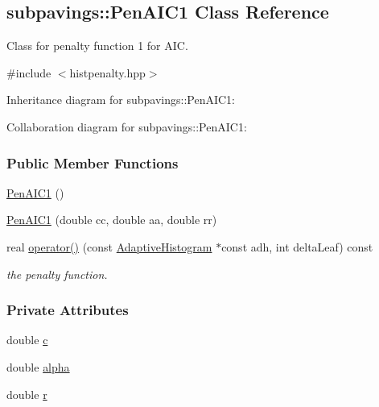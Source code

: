 \hypertarget{classsubpavings_1_1PenAIC1}{\subsection{subpavings\-:\-:\-Pen\-A\-I\-C1 \-Class \-Reference}
\label{classsubpavings_1_1PenAIC1}
}


\-Class for penalty function 1 for \-A\-I\-C.  




{\ttfamily \#include $<$histpenalty.\-hpp$>$}



\-Inheritance diagram for subpavings\-:\-:\-Pen\-A\-I\-C1\-:


\-Collaboration diagram for subpavings\-:\-:\-Pen\-A\-I\-C1\-:
\subsubsection*{\-Public \-Member \-Functions}
\begin{DoxyCompactItemize}
\item 
\hyperlink{classsubpavings_1_1PenAIC1_af50ef696466df5dd7d0a2af2969f5a34}{\-Pen\-A\-I\-C1} ()
\item 
\hyperlink{classsubpavings_1_1PenAIC1_a127629ff1787f6f756084fd95692dddc}{\-Pen\-A\-I\-C1} (double cc, double aa, double rr)
\item 
real \hyperlink{classsubpavings_1_1PenAIC1_a197da85b167c9086bfb90eeab0ec2375}{operator()} (const \hyperlink{classsubpavings_1_1AdaptiveHistogram}{\-Adaptive\-Histogram} $\ast$const adh, int delta\-Leaf) const 
\begin{DoxyCompactList}\small\item\em the penalty function. \end{DoxyCompactList}\end{DoxyCompactItemize}
\subsubsection*{\-Private \-Attributes}
\begin{DoxyCompactItemize}
\item 
double \hyperlink{classsubpavings_1_1PenAIC1_a8ee2e73a1cb5a953cd3ec61376a46baf}{c}
\item 
double \hyperlink{classsubpavings_1_1PenAIC1_a6d32c74620d16440e5e6d91242bb9736}{alpha}
\item 
double \hyperlink{classsubpavings_1_1PenAIC1_a669d71494e88f57e191d7b07f8dd53fa}{r}
\end{DoxyCompactItemize}


